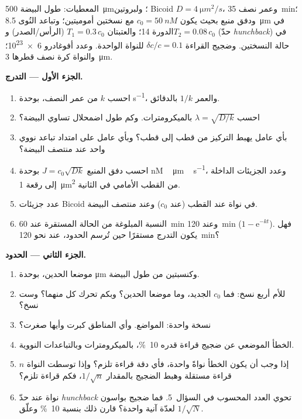 \begin{problem}
\label{pb:b3:developmental-genetics:1}
المعطيات: طول البيضة \qty{500}{\micro m}؛ ولبروتين Bicoid $D = \qty{4}{\micro m^2/s}$،
وعمر نصف \qty{35}{min}؛ ودفق منبع بحيث يكون $c_{0} = \qty{50}{nM}$
مع نسختين أموميتين؛ وتباعد النُوى \qty{8.5}{\micro m} في الدورة
14؛ والعتبتان $T_{1} = 0.3\,c_{0}$ (الرأس/الصدر) و$T_{2} =
0.08\,c_{0}$ (حدّ \emph{hunchback}) في حالة النسختين. وضجيج
القراءة $\delta c/c = 0.1$ للنواة الواحدة. وعدد أفوغادرو
\qty{6e23}{}؛ والنواة كرة نصف قطرها \qty{3}{\micro m}.

\medskip
\noindent\textbf{الجزء الأول --- التدرج.}
\begin{enumerate}
  \item احسب $k$ من عمر النصف، بوحدة \unit{s^{-1}}، والعمر
        $1/k$ بالدقائق.
  \item احسب $\lambda = \sqrt{D/k}$ بالميكرومترات. وكم طول
        اضمحلال تساوي البيضة؟
  \item بأي عامل يهبط التركيز من قطب إلى قطب؟ وبأي عامل على
        امتداد تباعد نووي واحد عند منتصف البيضة؟
  \item احسب دفق المنبع $J = c_{0}\sqrt{Dk}$ بوحدة
        \unit{nM\,\micro m\,s^{-1}}، وعدد الجزيئات الداخلة إلى
        رقعة \qty{1}{\micro m^2} من القطب الأمامي في الثانية.
  \item عدد جزيئات Bicoid في نواة عند القطب (عند $c_{0}$)
        وعند منتصف البيضة.
  \item النسبة المبلوغة من الحالة المستقرة عند \qty{60}{min}
        وعند \qty{120}{min} ($1 - \mathrm{e}^{-kt}$). فهل يكون
        التدرج مستقرًا حين تُرسم الحدود، عند نحو \qty{120}{min}؟
\end{enumerate}

\medskip
\noindent\textbf{الجزء الثاني --- الحدود.}
\begin{enumerate}[resume]
  \item موضعا الحدين، بوحدة \unit{\micro m} وكنسبتين من طول
        البيضة.
  \item للأم أربع نسخ: فما $c_{0}$ الجديد، وما موضعا الحدين؟
        وبكم تحرك كل منهما؟ وست نسخ؟
  \item نسخة واحدة: المواضع. وأي المناطق كبرت وأيها صغرت؟
  \item الخطأ الموضعي عن ضجيج قراءة قدره \qty{10}{\%}،
        بالميكرومترات وبالتباعدات النووية.
  \item إذا وجب أن يكون الخطأ نواةً واحدة، فأي دقة قراءة
        تلزم؟ وإذا توسطت النواة $n$ قراءة مستقلة وهبط الضجيج
        بالمقدار $1/\sqrt{n}$، فكم قراءة تلزم؟
  \item نواة عند حدّ \emph{hunchback} تحوي العدد المحسوب في
        السؤال~5. فما ضجيج بواسون $1/\sqrt{N}$ لعدّة آنية
        واحدة؟ قارن ذلك بنسبة \qty{10}{\%} وعلّق.
\end{enumerate}


\end{problem}
